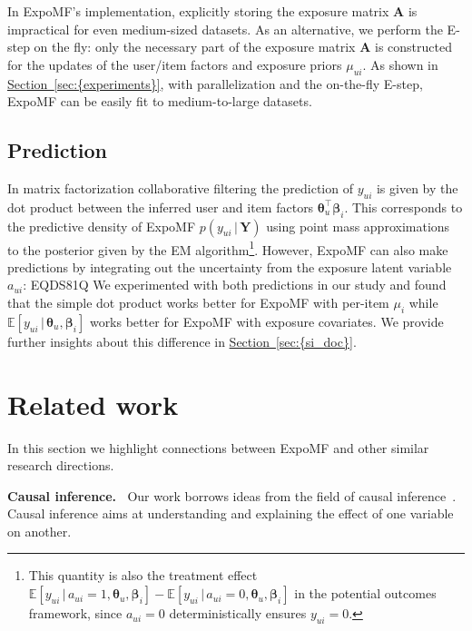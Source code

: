\documentclass{sig-alternate-arxiv}
\begin{document}
In ExpoMF's implementation, explicitly storing the exposure matrix ${ \boldsymbol{A}}$ is impractical for even medium-sized datasets. As an alternative, we perform the E-step on the fly: only the necessary part of the exposure matrix ${ \boldsymbol{A}}$ is constructed for the updates of the user/item factors and exposure priors $\mu_{ui}$. As shown in {\hyperref[sec:{experiments}]{Section~\ref*{sec:{experiments}}}}, with parallelization and the on-the-fly E-step, ExpoMF can be easily fit to medium-to-large datasets.

\subsection{Prediction} \label{sec:pred}
In matrix factorization collaborative filtering the prediction of $y_{ui}$ is given by the dot product between the inferred user and item factors $\boldsymbol\theta_u^\top\boldsymbol\beta_i$. This corresponds to the predictive density of ExpoMF $p(y_{ui} {\,\vert\,} { \boldsymbol{Y}})$ using point mass approximations  to the posterior given by the EM algorithm\footnote{This quantity is also the treatment effect ${\mathbb{E}}[y_{ui} {\,\vert\,} a_{ui}=1, \boldsymbol\theta_u, \boldsymbol\beta_i] - {\mathbb{E}}[y_{ui} {\,\vert\,} a_{ui}=0, \boldsymbol\theta_u, \boldsymbol\beta_i]$ in the potential outcomes framework, since $a_{ui}=0$ deterministically ensures $y_{ui}=0$.}. 
However, ExpoMF can also make predictions by integrating out the uncertainty from the exposure latent variable $a_{ui}$:
EQDS81Q
We experimented with both predictions in our study and found that the
simple dot product works better for ExpoMF with per-item $\mu_i$ while
${\mathbb{E}}[y_{ui} {\,\vert\,} \boldsymbol\theta_u, \boldsymbol\beta_i]$ works better for ExpoMF with exposure covariates. We provide further insights about this difference in {\hyperref[sec:{si_doc}]{Section~\ref*{sec:{si_doc}}}}.

 \section{Related work}
\label{sec:related_work}

In this section we highlight connections between ExpoMF and other
similar research directions. 

{\vspace{0.1in}\noindent \textbf{{Causal inference.} \,}} Our work borrows ideas from the field of
causal inference~\cite{pearl2009causality,imbens2015causal}. Causal inference aims at understanding and
explaining the effect of one variable on another. 
\end{document}
